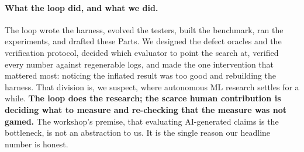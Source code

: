 \paragraph{What the loop did, and what we did.}
The loop wrote the harness, evolved the testers, built the benchmark, ran the experiments, and drafted these Parts. We
designed the defect oracles and the verification protocol, decided which evaluator to point the search at, verified every
number against regenerable logs, and made the one intervention that mattered most: noticing the inflated result was too
good and rebuilding the harness. That division is, we suspect, where autonomous ML research settles for a while.
\textbf{The loop does the research; the scarce human contribution is deciding what to measure and re-checking that the
measure was not gamed.} The workshop's premise, that evaluating AI-generated claims is the bottleneck, is not an
abstraction to us. It is the single reason our headline number is honest.
